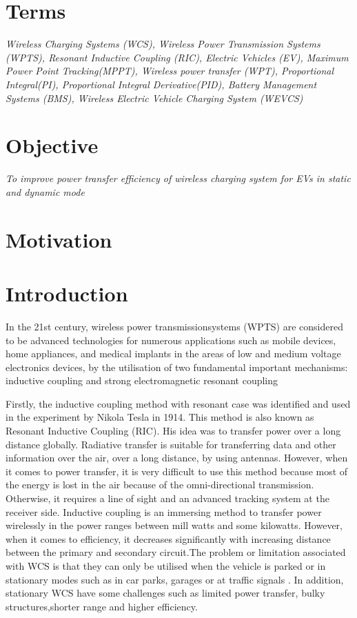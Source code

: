 \documentclass[12pt]{article}
\begin{document}

\tableofcontents
\newpage

\renewcommand{\baselinestretch}{1.5}
\section{Terms}
\textit{Wireless Charging Systems (WCS), 
	Wireless Power Transmission Systems (WPTS), 
	Resonant Inductive Coupling (RIC),
	Electric Vehicles (EV), 
	Maximum Power Point Tracking(MPPT),
	Wireless power transfer (WPT),
	Proportional Integral(PI),
	Proportional Integral Derivative(PID),
	Battery Management Systems (BMS),
Wireless Electric Vehicle Charging System (WEVCS)}


\section{Objective}
\textit{To improve power transfer efficiency of wireless charging system for EVs in static and dynamic mode}

\section{Motivation}
%

\section{Introduction}
In the 21st century, wireless power transmissionsystems (WPTS) are considered to be advanced technologies for numerous applications
such as mobile devices, home appliances, and medical implants in the areas of low and medium voltage electronics devices, by the utilisation of two fundamental important mechanisms: inductive coupling and strong electromagnetic resonant coupling %

Firstly, the inductive coupling method with resonant case was identified and used in the experiment by Nikola Tesla in 1914.  This method is also known as Resonant Inductive Coupling (RIC). His idea was to transfer power over a long distance globally. Radiative transfer is suitable for transferring data and other information over the air, over a long distance, by using antennas. However, when it comes to power transfer, it is very difficult to use this method because most of the energy is lost in the air because of the omni-directional transmission. Otherwise, it requires a line of sight and an advanced tracking system at the receiver side. Inductive coupling is an immersing method to transfer power wirelessly in the power ranges between mill watts and some kilowatts.
However, when it comes to efficiency, it decreases significantly with increasing distance between the primary and secondary circuit.The problem or limitation associated with WCS is that they can only be utilised when the vehicle is parked or in stationary modes such as in car parks, garages or at traffic signals . In addition, stationary WCS have some challenges such as limited power transfer, bulky structures,shorter range and higher efficiency. 
\end{document}
